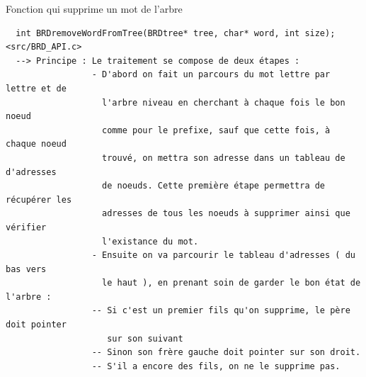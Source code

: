 \documentclass[a4paper,8pt]{report}
\begin{document}
Fonction qui supprime un mot de l'arbre
\begin{verbatim}
  int BRDremoveWordFromTree(BRDtree* tree, char* word, int size); <src/BRD_API.c>
  --> Principe : Le traitement se compose de deux étapes :
                 - D'abord on fait un parcours du mot lettre par lettre et de
                   l'arbre niveau en cherchant à chaque fois le bon noeud
                   comme pour le prefixe, sauf que cette fois, à chaque noeud
                   trouvé, on mettra son adresse dans un tableau de d'adresses
                   de noeuds. Cette première étape permettra de récupérer les
                   adresses de tous les noeuds à supprimer ainsi que vérifier
                   l'existance du mot.
                 - Ensuite on va parcourir le tableau d'adresses ( du bas vers
                   le haut ), en prenant soin de garder le bon état de l'arbre :
                 -- Si c'est un premier fils qu'on supprime, le père doit pointer
                    sur son suivant
                 -- Sinon son frère gauche doit pointer sur son droit.
                 -- S'il a encore des fils, on ne le supprime pas.
\end{verbatim}
\end{document}
